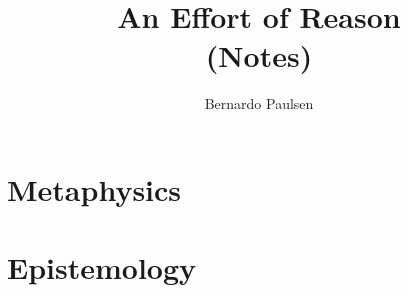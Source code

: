 \documentclass{book}
\title{An Effort of Reason
\\
(Notes)}
\author{Bernardo Paulsen}
\begin{document}
\maketitle
\tableofcontents

\frontmatter





\mainmatter

\part{Metaphysics}
\label{part:metaphysics}




\part{Epistemology}
\label{part:epistemology}






 





\backmatter


\end{document}
